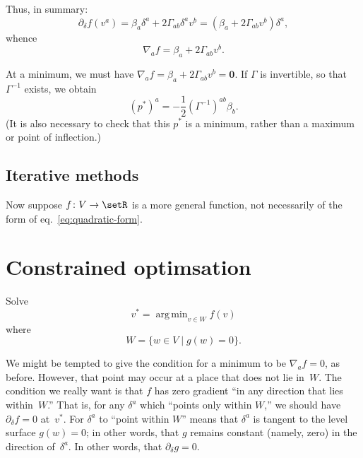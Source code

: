 \documentclass[10pt, a4paper]{article}
\newcommand{\bzero}{\mathbold{0}} %
\DeclareMathOperator*{\argmin}{arg\,min}
\begin{document}
Thus, in summary:
\begin{equation*}
  \partial_\delta f(v^a) = \beta_a \delta^a + 2\Gamma_{ab}\delta^av^b =(\beta_a+2\Gamma_{ab}v^b)\delta^a,
\end{equation*}
whence
\begin{equation*}
  \nabla_af = \beta_a+2\Gamma_{ab}v^b.
\end{equation*}

At a minimum, we must have
$\nabla_af = \beta_a+2\Gamma_{ab}v^b = \bzero$. If $\Gamma$ is invertible, so that
$\Gamma^{-1}$ exists, we obtain
\begin{equation*}
  {(p^*)}^a = -\frac{1}{2}{(\Gamma^{-1})}^{ab}\beta_b.
\end{equation*}
(It is also necessary to check that this $p^*$ is a minimum, rather
than a maximum or point of inflection.)

\subsection{Iterative methods}

Now suppose $f\colon V\to\setR$ is a more general function, not
necessarily of the form of eq.~\eqref{eq:quadratic-form}. 

\section{Constrained optimsation}

Solve
\begin{equation*}
    \label{eq:linear-constraint}
    v^* = \argmin_{v\in W} f(v)
\end{equation*}
where
\begin{equation*}
   W=\{w \in V \mid g(w) = 0\}.
\end{equation*}

We might be tempted to give the condition for a minimum to be
$\nabla_a f=0$, as before. However, that point may occur at a place that
does not lie in~$W$. The condition we really want is that $f$ has zero
gradient ``in any direction that lies within~$W$.'' That is, for any
$\delta^a$ which ``points only within $W$,'' we should have
$\partial_\delta f = 0$ at~$v^*$. For $\delta^a$ to ``point within
$W$'' means that $\delta^a$ is tangent to the level surface
$g(w) = 0$; in other words, that $g$ remains constant (namely, zero)
in the direction of~$\delta^a$. In other words, that
$\partial_\delta g = 0$. 
\end{document}
